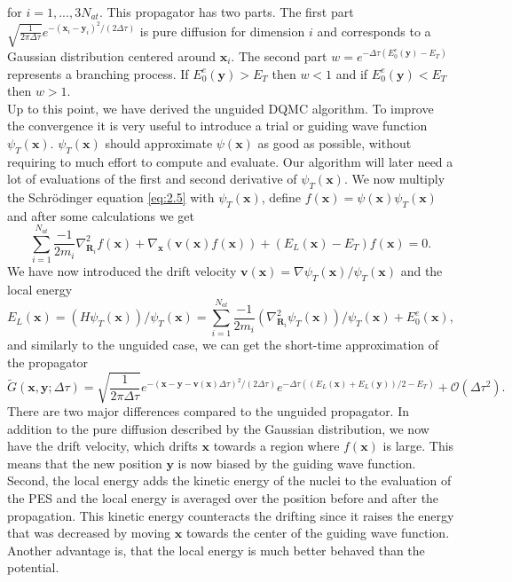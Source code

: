 \documentclass [12pt]{report}
\begin{document}
for $i=1,...,3N_{at}$. This propagator has two parts. The first part $\sqrt{\frac{1}{2 \pi \Delta \tau}} e^{-(\bm{x}_i-\bm{y}_i)^2/(2\Delta \tau)}$ is pure diffusion for dimension $i$ and corresponds to a Gaussian distribution centered around $\bm{x}_i$. The second part $w = e^{-\Delta \tau (E_0^e(\bm{y}) - E_T)}$ represents a branching process. If $E_0^e(\bm{y}) > E_T$ then $w < 1$ and if $E_0^e(\bm{y}) < E_T$ then $w > 1$. \\
Up to this point, we have derived the unguided DQMC algorithm. To improve the convergence it is very useful to introduce a trial or guiding wave function $\psi_T(\bm{x})$. $\psi_T(\bm{x})$ should approximate $\psi(\bm{x})$ as good as possible, without requiring to much effort to compute and evaluate. Our algorithm will later need a lot of evaluations of the first and second derivative of $\psi_T(\bm{x})$. We now multiply the Schrödinger equation \eqref{eq:2.5} with $\psi_T(\bm{x})$, define $f(\bm{x}) = \psi(\bm{x}) \psi_T(\bm{x})$ and after some calculations \cite{cyrus2} we get
\begin{equation} \label{eq:2.8}
\sum_{i=1}^{N_{at}} \frac{-1}{2m_i} \nabla^2_{\bm{R}_i} f(\bm{x}) + \nabla_{\bm{x}} (\bm{v}(\bm{x}) f(\bm{x})) + (E_L(\bm{x}) - E_T)f(\bm{x}) = 0.
\end{equation}
We have now introduced the drift velocity $\bm{v}(\bm{x}) = \nabla \psi_T(\bm{x})/ \psi_T(\bm{x})$ and the local energy 
\begin{equation}\label{el}
E_L(\bm{x}) = (H\psi_T(\bm{x}))/\psi_T(\bm{x}) = \sum_{i=1}^{N_{at}} \frac{-1}{2m_i} (\nabla^2_{\bm{R}_i} \psi_T(\bm{x}))/\psi_T(\bm{x}) + E_0^e(\bm{x}),
\end{equation}
and similarly to the unguided case, we can get the short-time approximation of the propagator
\begin{equation} \label{eq:2.9}
\tilde{G}(\bm{x},\bm{y};\Delta \tau) = \sqrt{\frac{1}{2 \pi \Delta \tau}} e^{-(\bm{x}-\bm{y}-\bm{v}(\bm{x})\Delta \tau)^2 /(2 \Delta \tau)} e^{-\Delta \tau ((E_L(\bm{x})+E_L(\bm{y}))/2 - E_T)} + \mathcal{O}(\Delta \tau^2).
\end{equation}
There are two major differences compared to the unguided propagator. In addition to the pure diffusion described by the Gaussian distribution, we now have the drift velocity, which drifts $\bm{x}$ towards a region where $f(\bm{x})$ is large. This means that the new position $\bm{y}$ is now biased by the guiding wave function. Second, the local energy adds the kinetic energy of the nuclei to the evaluation of the PES and the local energy is averaged over the position before and after the propagation. This kinetic energy counteracts the drifting since it raises the energy that was decreased by moving $\bm{x}$ towards the center of the guiding wave function. Another advantage is, that the local energy is much better behaved than the potential.
\end{document}
